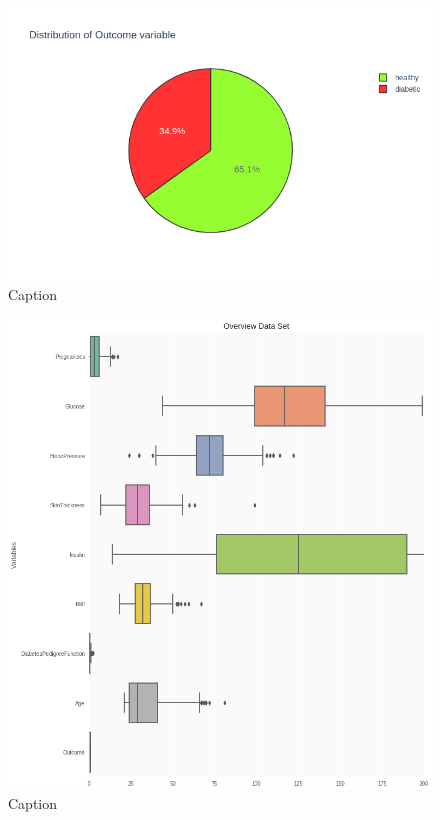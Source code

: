 \documentclass[12pt]{article}
\begin{document}
\begin{figure}[ht]
\centering
\includegraphics[width=1\textwidth]{2.png}
\caption{\label{fig:9} Caption}
\end{figure}

\begin{figure}[ht]
\centering
\includegraphics[width=1\textwidth]{3.png}
\caption{\label{fig:10} Caption}
\end{figure}
\end{document}
